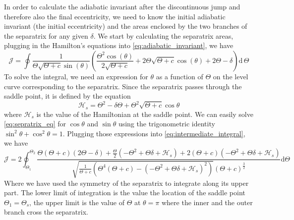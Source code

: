 \documentclass[twoside,openright,titlepage,numbers=noenddot,headinclude,%
                footinclude=true,cleardoublepage=empty,abstractoff, 
                BCOR=5mm,paper=a4,fontsize=11pt,%
                american,%
                ]{scrreprt}%
\begin{document}
In order to calculate the adiabatic invariant after the discontinuous
jump and therefore also the final eccentricity, we need to know
the initial adiabatic invariant (the initial eccentricity) and
the areas enclosed by the two branches of the separatrix for any
given $\delta$. We start by calculating the separatrix areas, 
plugging in the Hamilton's equations into \cref{eq:adiabatic_invariant},
we have
\begin{equation}
    \mathcal{J}=\oint \frac{1}{\Theta \sqrt{\Theta + c} 
    \sin{\left (\theta \right )}} 
    \left(\frac{\Theta^{2} \cos{\left (\theta \right )}}
    {2 \sqrt{\Theta + c}} + 2 \Theta \sqrt{\Theta + c} 
    \cos{\left (\theta \right )} + 2 \Theta - \delta\right)\mathrm{d}\,\Theta
    \label{eq:intermediate_integral}
\end{equation}
To solve the integral, we need an expression for $\theta$ as a
function of $\Theta$ on the level curve corresponding to the separatrix.
Since the separatrix passes through the saddle point, it is defined by
the equation
\begin{equation}
    \mathcal{H}_s=\Theta^2-\delta\Theta+\Theta^2\sqrt{\Theta+c}\cos\theta
    \label{eq:sepratrix_eq}
\end{equation}
where $\mathcal{H}_s$ is the value of the Hamiltonian at the saddle point.
We can easily solve \cref{eq:sepratrix_eq} for $\cos\theta$ and $\sin\theta$
using the trigonometric identity $\sin^2\theta+\cos^2\theta=1$. Plugging
those expressions into \cref{eq:intermediate_integral}, we have
\begin{equation}
    \mathcal{J}=2\oint_{\Theta_1}^{\Theta_2}\frac{\Theta 
    \left(\Theta + c\right) \left(2 \Theta - 
    \delta\right) + \frac{\Theta}{2} \left(- \Theta^{2} + \Theta \delta 
    + \mathcal{H}_s\right) + 2 \left(\Theta + c\right) \left(- \Theta^{2}
    + \Theta \delta + \mathcal{H}_s\right)}{\sqrt{\frac{1}{\Theta + c} 
    \left(\Theta^{4} \left(\Theta + c\right) - \left(- \Theta^{2} +
    \Theta \delta + \mathcal{H}_s\right)^{2}\right)} \left(\Theta + 
    c\right)^{\frac{3}{2}}}\mathrm{d}\Theta
    \label{eq:massive_integral}
\end{equation}
Where we have used the symmetry of the separatrix to integrate along 
its upper part. The lower limit of integration is the value the location of the saddle
point $\Theta_1=\Theta_s$, the upper limit is the value of $\Theta$
at $\theta=\pi$ where the inner and the outer branch cross the separatrix.
\end{document}
